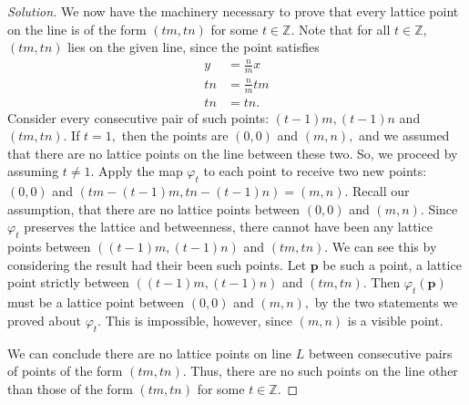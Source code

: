 \documentclass[12pt]{article}
\newcommand{\Z}{\mathbb{Z}}
\newenvironment{exercise}[2][Exercise]{\begin{trivlist}
        \item[\hskip \labelsep {\bfseries #1}\hskip \labelsep {\bfseries #2.}]}{\end{trivlist}}
\newenvironment{solution}
        {\begin{proof}[Solution]}
                    {\end{proof}}
\begin{document}
\begin{exercise}{26}
\begin{solution}
        We now have the machinery necessary to prove that every lattice point on the line is of the form \( ( tm, tn ) \) for some \( t \in \Z. \) Note that for all \( t \in \Z, \) \( ( tm,tn ) \) lies on the given line, since the point satisfies
        \begin{align*}
            y &= \frac{n}{m} x \\
            tn &= \frac{n}{m} tm\\
            tn &= tn.
        \end{align*}
        Consider every consecutive pair of such points: \( ( t-1 ) m, ( t-1 ) n \) and \( ( tm, tn ) . \) If \( t = 1, \) then the points are \( ( 0,0 ) \) and \( ( m,n ) , \) and we assumed that there are no lattice points on the line between these two. So, we proceed by assuming \( t\neq 1. \) Apply the map \( \varphi_{t} \) to each point to receive two new points: \( ( 0,0 ) \) and \( ( tm - (t-1)m, tn - ( t-1 )n ) = ( m,n ) . \) Recall our assumption, that there are no lattice points between \( ( 0,0 ) \) and \( ( m,n ) . \) Since \( \varphi_{t} \) preserves the lattice and betweenness, there cannot have been any lattice points between \( (( t-1 ) m, ( t-1 ) n) \) and \(( tm,tn ) .  \) We can see this by considering the result had their been such points. Let \( \mathbf{p} \) be such a point, a lattice point strictly between \( ( ( t-1 ) m, ( t-1 ) n ) \) and \( ( tm, tn ) . \) Then \( \varphi_{t}(\mathbf{p}) \) must be a lattice point between \( ( 0,0 ) \) and \( ( m,n ) , \) by the two statements we proved about \( \varphi_{t} . \) This is impossible, however, since \( ( m,n ) \) is a visible point.

        We can conclude there are no lattice points on line \( L \) between consecutive pairs of points of the form \( ( tm, tn ) . \) Thus, there are no such points on the line other than those of the form \( ( tm, tn ) \) for some \( t \in \Z. \)
    \end{solution}
\end{exercise}
\end{document}
